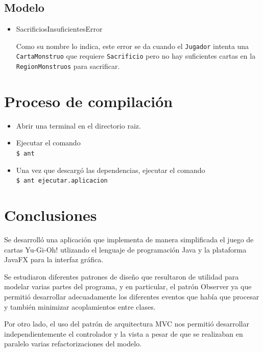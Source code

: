 	\subsection{Modelo}
	
	\begin{itemize}
		\item SacrificiosInsuficientesError
		
		Como su nombre lo indica, este error se da cuando el \texttt{Jugador} intenta  una \texttt{CartaMonstruo} que requiere \texttt{Sacrificio} pero no hay suficientes cartas en la \texttt{RegionMonstruos} para sacrificar.
		
	\end{itemize}

	\section{Proceso de compilación}
	
	\begin{itemize}
	\item Abrir una terminal en el directorio raiz.
	\item Ejecutar el comando \\
			\texttt{\$ ant}
	\item Una vez que descargó las dependencias, ejecutar el comando \\
			\texttt{\$ ant ejecutar.aplicacion}
	\end{itemize}
	
	\section{Conclusiones}
	
	Se desarrolló una aplicación que implementa de manera simplificada el juego de cartas Yu-Gi-Oh! utlizando el lenguaje de programación Java y la plataforma JavaFX para la interfaz gráfica.
	
	Se estudiaron diferentes patrones de diseño que resultaron de utilidad para modelar varias partes del programa, y en particular, el patrón Observer ya que permitió desarrollar adecuadamente los diferentes eventos que había que procesar y también minimizar acoplamientos entre clases.
	
	Por otro lado, el uso del patrón de arquitectura MVC nos permitió desarrollar independientemente el controlador y la vista a pesar de que se realizaban en paralelo varias refactorizaciones del modelo.
	

